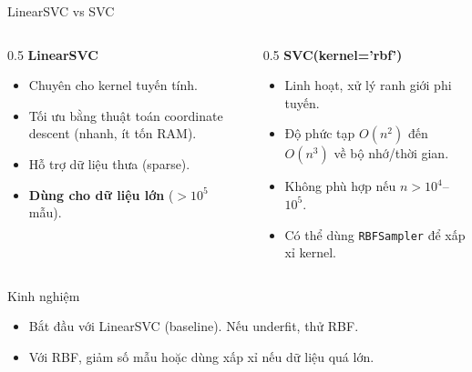 \begin{frame}{LinearSVC vs SVC}
  \begin{columns}[T]
    \begin{column}{0.5\textwidth}
      \textbf{LinearSVC}
      \begin{itemize}
        \item Chuyên cho kernel tuyến tính.
        \item Tối ưu bằng thuật toán coordinate descent (nhanh, ít tốn RAM).
        \item Hỗ trợ dữ liệu thưa (sparse).
        \item \textbf{Dùng cho dữ liệu lớn} ($>10^5$ mẫu).
      \end{itemize}
    \end{column}
    \begin{column}{0.5\textwidth}
      \textbf{SVC(kernel='rbf')}
      \begin{itemize}
        \item Linh hoạt, xử lý ranh giới phi tuyến.
        \item Độ phức tạp $O(n^2)$ đến $O(n^3)$ về bộ nhớ/thời gian.
        \item Không phù hợp nếu $n > 10^4$–$10^5$.
        \item Có thể dùng \texttt{RBFSampler} để xấp xỉ kernel.
      \end{itemize}
    \end{column}
  \end{columns}
  \vspace{0.3cm}
  \begin{block}{Kinh nghiệm}
    \begin{itemize}
      \item Bắt đầu với LinearSVC (baseline). Nếu underfit, thử RBF.
      \item Với RBF, giảm số mẫu hoặc dùng xấp xỉ nếu dữ liệu quá lớn.
    \end{itemize}
  \end{block}
\end{frame}


